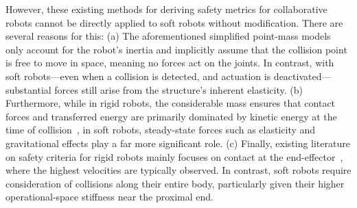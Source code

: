 However, these existing methods for deriving safety metrics for collaborative robots cannot be directly applied to soft robots without modification. There are several reasons for this: (a) The aforementioned simplified point-mass models only account for the robot’s inertia and implicitly assume that the collision point is free to move in space, meaning no forces act on the joints. In contrast, with soft robots—even when a collision is detected, and actuation is deactivated—substantial forces still arise from the structure’s inherent elasticity. (b) Furthermore, while in rigid robots, the considerable mass ensures that contact forces and transferred energy are primarily dominated by kinetic energy at the time of collision~\citep{haddadin2009requirements}, in soft robots, steady-state forces such as elasticity and gravitational effects play a far more significant role. (c) Finally, existing literature on safety criteria for rigid robots mainly focuses on contact at the end-effector~\citep{haddadin2009requirements, haddadin2013towards}, where the highest velocities are typically observed. In contrast, soft robots require consideration of collisions along their entire body, particularly given their higher operational-space stiffness near the proximal end.

